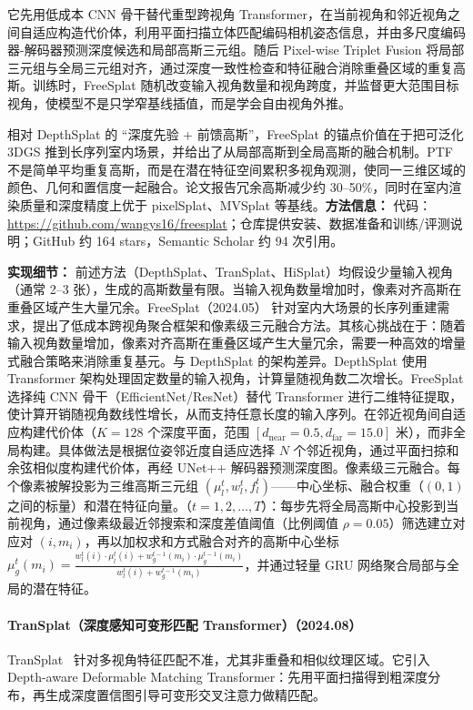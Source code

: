 它先用低成本 CNN 骨干替代重型跨视角 Transformer，在当前视角和邻近视角之间自适应构造代价体，利用平面扫描立体匹配编码相机姿态信息，并由多尺度编码器-解码器预测深度候选和局部高斯三元组。随后 Pixel-wise Triplet Fusion 将局部三元组与全局三元组对齐，通过深度一致性检查和特征融合消除重叠区域的重复高斯。训练时，FreeSplat 随机改变输入视角数量和视角跨度，并监督更大范围目标视角，使模型不是只学窄基线插值，而是学会自由视角外推。

相对 DepthSplat 的 ``深度先验 + 前馈高斯''，FreeSplat 的锚点价值在于把可泛化 3DGS 推到长序列室内场景，并给出了从局部高斯到全局高斯的融合机制。PTF 不是简单平均重复高斯，而是在潜在特征空间累积多视角观测，使同一三维区域的颜色、几何和置信度一起融合。论文报告冗余高斯减少约 30--50\%，同时在室内渲染质量和深度精度上优于 pixelSplat、MVSplat 等基线。\textbf{方法信息：} 代码：\url{https://github.com/wangys16/freesplat}；仓库提供安装、数据准备和训练/评测说明；GitHub 约 164 stars，Semantic Scholar 约 94 次引用。

\textbf{实现细节：} 前述方法（DepthSplat、TranSplat、HiSplat）均假设少量输入视角（通常 2--3 张），生成的高斯数量有限。当输入视角数量增加时，像素对齐高斯在重叠区域产生大量冗余。FreeSplat（2024.05） 针对室内大场景的长序列重建需求，提出了低成本跨视角聚合框架和像素级三元融合方法。其核心挑战在于：随着输入视角数量增加，像素对齐高斯在重叠区域产生大量冗余，需要一种高效的增量式融合策略来消除重复基元。与 DepthSplat 的架构差异。DepthSplat 使用 Transformer 架构处理固定数量的输入视角，计算量随视角数二次增长。FreeSplat 选择纯 CNN 骨干（EfficientNet/ResNet）替代 Transformer 进行二维特征提取，使计算开销随视角数线性增长，从而支持任意长度的输入序列。在邻近视角间自适应构建代价体（$K{=}128$ 个深度平面，范围 $[d_{\mathrm{near}}{=}0.5, d_{\mathrm{far}}{=}15.0]$ 米），而非全局构建。具体做法是根据位姿邻近度自适应选择 $N$ 个邻近视角，通过平面扫掠和余弦相似度构建代价体，再经 UNet++ 解码器预测深度图。像素级三元融合。每个像素被解投影为三维高斯三元组 $(\mu_l^t, w_l^t, f_l^t)$——中心坐标、融合权重（$(0,1)$ 之间的标量）和潜在特征向量。（$t{=}1, 2, \ldots, T$）：每步先将全局高斯中心投影到当前视角，通过像素级最近邻搜索和深度差值阈值（比例阈值 $\rho{=}0.05$）筛选建立对应对 $(i, m_i)$，再以加权求和方式融合对齐的高斯中心坐标 $\mu_g^t(m_i) = \frac{w_l^t(i) \cdot \mu_l^t(i) + w_g^{t-1}(m_i) \cdot \mu_g^{t-1}(m_i)}{w_l^t(i) + w_g^{t-1}(m_i)}$，并通过轻量 GRU 网络聚合局部与全局的潜在特征。



\paragraph{TranSplat（深度感知可变形匹配 Transformer）（2024.08）}
TranSplat~\cite{2408_13770} 针对多视角特征匹配不准，尤其非重叠和相似纹理区域。它引入 Depth-aware Deformable Matching Transformer：先用平面扫描得到粗深度分布，再生成深度置信图引导可变形交叉注意力做精匹配。

